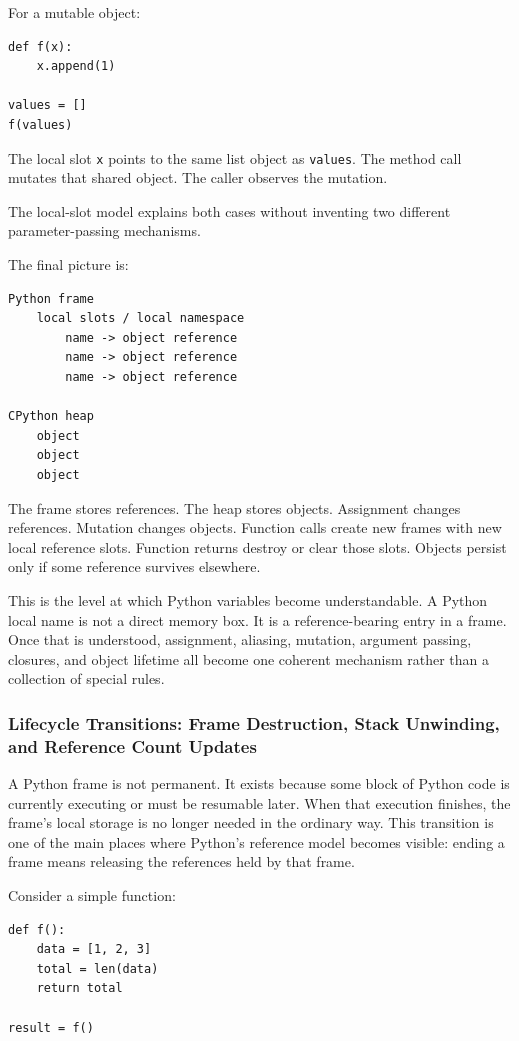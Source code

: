For a mutable object:

\begin{verbatim}
def f(x):
    x.append(1)

values = []
f(values)
\end{verbatim}

The local slot \texttt{x} points to the same list object as \texttt{values}. The method call mutates that shared object. The caller observes the mutation.

The local-slot model explains both cases without inventing two different parameter-passing mechanisms.

The final picture is:

\begin{verbatim}
Python frame
    local slots / local namespace
        name -> object reference
        name -> object reference
        name -> object reference

CPython heap
    object
    object
    object
\end{verbatim}

The frame stores references. The heap stores objects. Assignment changes references. Mutation changes objects. Function calls create new frames with new local reference slots. Function returns destroy or clear those slots. Objects persist only if some reference survives elsewhere.

This is the level at which Python variables become understandable. A Python local name is not a direct memory box. It is a reference-bearing entry in a frame. Once that is understood, assignment, aliasing, mutation, argument passing, closures, and object lifetime all become one coherent mechanism rather than a collection of special rules.

\subsubsection{Lifecycle Transitions: Frame Destruction, Stack Unwinding, and Reference Count Updates}

A Python frame is not permanent. It exists because some block of Python code is currently executing or must be resumable later. When that execution finishes, the frame's local storage is no longer needed in the ordinary way. This transition is one of the main places where Python's reference model becomes visible: ending a frame means releasing the references held by that frame.

Consider a simple function:

\begin{verbatim}
def f():
    data = [1, 2, 3]
    total = len(data)
    return total

result = f()
\end{verbatim}

